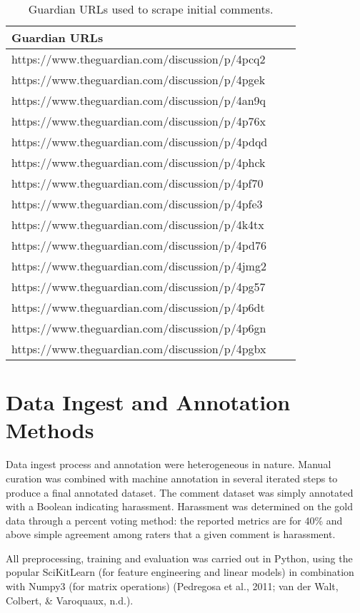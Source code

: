 \documentclass[11pt,a4paper]{article}
\begin{document}
\begin{table}[h]
\begin{center}
\begin{tabular}{|l|rl|}
\hline \bf Guardian URLs \\ \hline
https://www.theguardian.com/discussion/p/4pcq2 \\
https://www.theguardian.com/discussion/p/4pgek \\
https://www.theguardian.com/discussion/p/4an9q \\
https://www.theguardian.com/discussion/p/4p76x \\
https://www.theguardian.com/discussion/p/4pdqd \\
https://www.theguardian.com/discussion/p/4phck \\
https://www.theguardian.com/discussion/p/4pf70 \\
https://www.theguardian.com/discussion/p/4pfe3 \\
https://www.theguardian.com/discussion/p/4k4tx \\
https://www.theguardian.com/discussion/p/4pd76 \\
https://www.theguardian.com/discussion/p/4jmg2 \\
https://www.theguardian.com/discussion/p/4pg57 \\
https://www.theguardian.com/discussion/p/4p6dt \\
https://www.theguardian.com/discussion/p/4p6gn \\
https://www.theguardian.com/discussion/p/4pgbx \\
\hline
\end{tabular}
\end{center}
\caption{\label{font-table} Guardian URLs used to scrape initial comments. }
\end{table}

\section{Data Ingest and Annotation Methods}
Data ingest process and annotation were heterogeneous
in nature. Manual curation was combined
with machine annotation in several iterated steps to
produce a final annotated dataset. The comment dataset
was simply annotated with a Boolean indicating
harassment. Harassment was determined on the
gold data through a percent voting method: the reported
metrics are for 40\% and above simple agreement
among raters that a given comment is harassment.

All preprocessing, training and evaluation was
carried out in Python, using the popular SciKitLearn
(for feature engineering and linear models)
in combination with Numpy3 (for matrix operations)
(Pedregosa et al., 2011; van der Walt, Colbert,
\& Varoquaux, n.d.).
\end{document}
